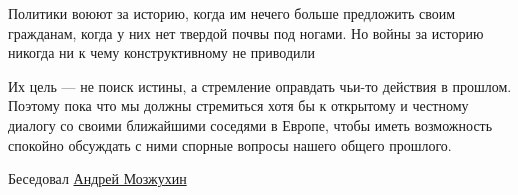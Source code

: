 \begin{leftbar}
	\large
Политики воюют за историю, когда им нечего больше предложить своим гражданам,
когда у них нет твердой почвы под ногами. Но войны за историю никогда
ни к чему конструктивному не приводили
\end{leftbar}

Их цель — не поиск истины, а стремление оправдать чьи-то действия в прошлом.
Поэтому пока что мы должны стремиться хотя бы к открытому и честному диалогу со
своими ближайшими соседями в Европе, чтобы иметь возможность спокойно обсуждать
с ними спорные вопросы нашего общего прошлого.

Беседовал \href{https://lenta.ru/parts/authors/mozjukhin/}{Андрей Мозжухин}
